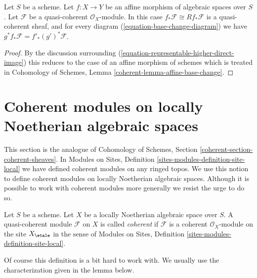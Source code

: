 \begin{lemma}
\label{lemma-affine-base-change}
Let $S$ be a scheme. Let $f : X \to Y$ be an affine morphism of algebraic
spaces over $S$. Let $\mathcal{F}$ be a quasi-coherent $\mathcal{O}_X$-module.
In this case $f_*\mathcal{F} \cong Rf_*\mathcal{F}$ is a quasi-coherent
sheaf, and for every diagram (\ref{equation-base-change-diagram})
we have $g^*f_*\mathcal{F} = f'_*(g')^*\mathcal{F}$.
\end{lemma}

\begin{proof}
By the discussion surrounding
(\ref{equation-representable-higher-direct-image})
this reduces to the case of an affine morphism of schemes which
is treated in Cohomology of Schemes, Lemma
\ref{coherent-lemma-affine-base-change}.
\end{proof}


\section{Coherent modules on locally Noetherian algebraic spaces}
\label{section-coherent}

\noindent
This section is the analogue of
Cohomology of Schemes, Section \ref{coherent-section-coherent-sheaves}.
In Modules on Sites, Definition \ref{sites-modules-definition-site-local}
we have defined coherent modules on any ringed topos. We use this notion
to define coherent modules on locally Noetherian algebraic spaces.
Although it is possible to work with coherent modules more generally
we resist the urge to do so.

\begin{definition}
\label{definition-coherent}
Let $S$ be a scheme. Let $X$ be a locally Noetherian algebraic space over $S$.
A quasi-coherent module $\mathcal{F}$ on $X$ is called {\it coherent}
if $\mathcal{F}$ is a coherent $\mathcal{O}_X$-module on the site
$X_\etale$ in the sense of
Modules on Sites, Definition \ref{sites-modules-definition-site-local}.
\end{definition}

\noindent
Of course this definition is a bit hard to work with. We usually use
the characterization given in the lemma below.

